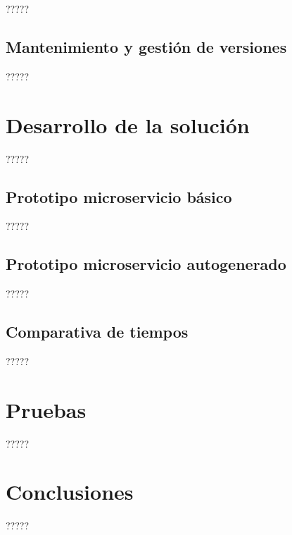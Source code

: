 \documentclass[11pt,spanish,listoffigures]{tfgetsinf}
\begin{document}
?????

\section{Mantenimiento y gestión de versiones}

?????


\chapter{Desarrollo de la solución}

?????

\section{Prototipo microservicio básico}

?????

\section{Prototipo microservicio autogenerado}

?????

\section{Comparativa de tiempos}

?????


\chapter{Pruebas}

?????


\chapter{Conclusiones}

?????

\end{document}
